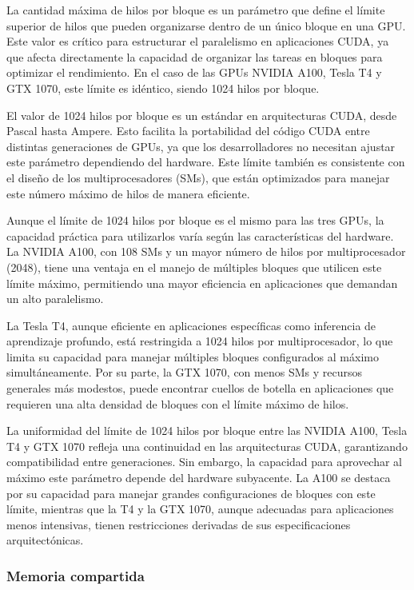 \documentclass{article}
\begin{document}
			La cantidad máxima de hilos por bloque es un parámetro que define el límite superior de hilos que pueden organizarse dentro de un único bloque en una GPU. Este valor es crítico para estructurar el paralelismo en aplicaciones CUDA, ya que afecta directamente la capacidad de organizar las tareas en bloques para optimizar el rendimiento. En el caso de las GPUs NVIDIA A100, Tesla T4 y GTX 1070, este límite es idéntico, siendo 1024 hilos por bloque.

			El valor de 1024 hilos por bloque es un estándar en arquitecturas CUDA, desde Pascal hasta Ampere. Esto facilita la portabilidad del código CUDA entre distintas generaciones de GPUs, ya que los desarrolladores no necesitan ajustar este parámetro dependiendo del hardware. Este límite también es consistente con el diseño de los multiprocesadores (SMs), que están optimizados para manejar este número máximo de hilos de manera eficiente.

			Aunque el límite de 1024 hilos por bloque es el mismo para las tres GPUs, la capacidad práctica para utilizarlos varía según las características del hardware. La NVIDIA A100, con 108 SMs y un mayor número de hilos por multiprocesador (2048), tiene una ventaja en el manejo de múltiples bloques que utilicen este límite máximo, permitiendo una mayor eficiencia en aplicaciones que demandan un alto paralelismo.

			La Tesla T4, aunque eficiente en aplicaciones específicas como inferencia de aprendizaje profundo, está restringida a 1024 hilos por multiprocesador, lo que limita su capacidad para manejar múltiples bloques configurados al máximo simultáneamente. Por su parte, la GTX 1070, con menos SMs y recursos generales más modestos, puede encontrar cuellos de botella en aplicaciones que requieren una alta densidad de bloques con el límite máximo de hilos.

			La uniformidad del límite de 1024 hilos por bloque entre las NVIDIA A100, Tesla T4 y GTX 1070 refleja una continuidad en las arquitecturas CUDA, garantizando compatibilidad entre generaciones. Sin embargo, la capacidad para aprovechar al máximo este parámetro depende del hardware subyacente. La A100 se destaca por su capacidad para manejar grandes configuraciones de bloques con este límite, mientras que la T4 y la GTX 1070, aunque adecuadas para aplicaciones menos intensivas, tienen restricciones derivadas de sus especificaciones arquitectónicas.

		\subsubsection{Memoria compartida}
\end{document}
